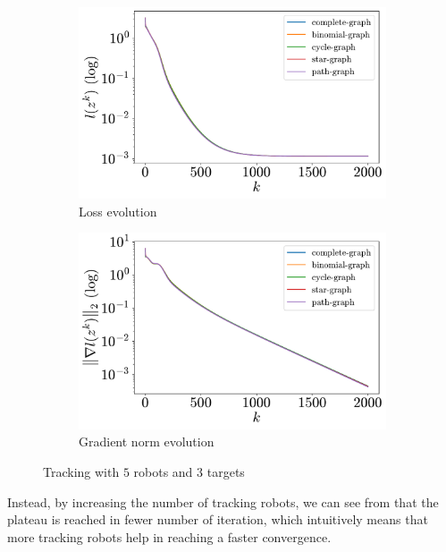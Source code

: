 \documentclass[a4paper,11pt,oneside]{book}
\begin{document}
\begin{figure}[htb!]
      \centering
      \begin{subfigure}[t]{0.46\linewidth}
            \centering
            \includegraphics[width=\linewidth]{./figs/tracking/5_3_2_2000/loss.pdf} 
            \caption{Loss evolution}
      \end{subfigure}
      \hfill
      \begin{subfigure}[t]{0.46\linewidth}
            \centering
            \includegraphics[width=\linewidth]{./figs/tracking/5_3_2_2000/gradient.pdf} 
            \caption{Gradient norm evolution}
      \end{subfigure}
      \caption{Tracking with $5$ robots and $3$ targets}
      \label{fig:tracking_5_3}
\end{figure}

Instead, by increasing the number of tracking robots, we can see from  that the plateau is reached in fewer number of iteration, which intuitively means that more tracking robots help in reaching a faster convergence.
\end{document}
